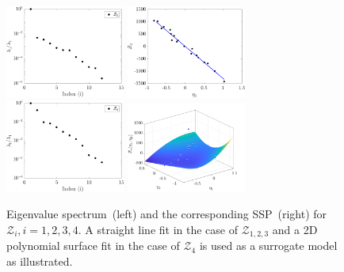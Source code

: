 \begin{figure}[htbp]
\begin{center}
\\
\includegraphics[width=0.35\textwidth]{./Figures/eig_Zf3} 
\includegraphics[width=0.35\textwidth]{./Figures/SSP_Zf3} 
\\
\includegraphics[width=0.35\textwidth]{./Figures/eig_Zf4} 
\includegraphics[width=0.35\textwidth]{./Figures/SSP2D_Zf4} 
\end{center}
\caption{Eigenvalue spectrum~(left) and the corresponding SSP~(right) for $\mathcal{Z}_i, i=1,2,3,4$.
A straight line fit in the case of $\mathcal{Z}_{1,2,3}$ and a
2D polynomial surface fit in the case of $\mathcal{Z}_4$ is used as a surrogate model as illustrated.}
\label{fig:as1}
\end{figure}
%
%
